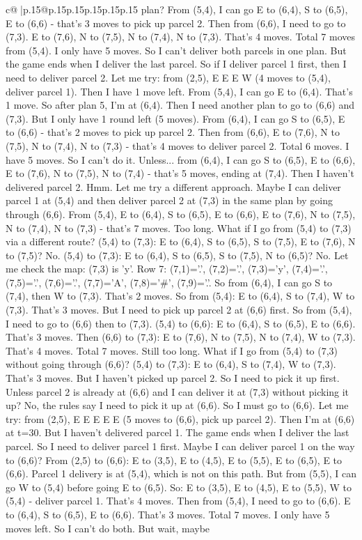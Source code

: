 \documentclass{article}
\begin{document}
{\begin{supertabular}{c@{$\;$}|p{.15\linewidth}@{}p{.15\linewidth}p{.15\linewidth}p{.15\linewidth}p{.15\linewidth}p{.15\linewidth}}
{{{plan? From (5,4), I can go E to (6,4), S to (6,5), E to (6,6) {-} that's 3 moves to pick up parcel 2. Then from (6,6), I need to go to (7,3). E to (7,6), N to (7,5), N to (7,4), N to (7,3). That's 4 moves. Total 7 moves from (5,4). I only have 5 moves. So I can't deliver both parcels in one plan. But the game ends when I deliver the last parcel. So if I deliver parcel 1 first, then I need to deliver parcel 2. Let me try: from (2,5), E E E W (4 moves to (5,4), deliver parcel 1). Then I have 1 move left. From (5,4), I can go E to (6,4). That's 1 move. So after plan 5, I'm at (6,4). Then I need another plan to go to (6,6) and (7,3). But I only have 1 round left (5 moves). From (6,4), I can go S to (6,5), E to (6,6) {-} that's 2 moves to pick up parcel 2. Then from (6,6), E to (7,6), N to (7,5), N to (7,4), N to (7,3) {-} that's 4 moves to deliver parcel 2. Total 6 moves. I have 5 moves. So I can't do it. Unless... from (6,4), I can go S to (6,5), E to (6,6), E to (7,6), N to (7,5), N to (7,4) {-} that's 5 moves, ending at (7,4). Then I haven't delivered parcel 2. Hmm. Let me try a different approach. Maybe I can deliver parcel 1 at (5,4) and then deliver parcel 2 at (7,3) in the same plan by going through (6,6). From (5,4), E to (6,4), S to (6,5), E to (6,6), E to (7,6), N to (7,5), N to (7,4), N to (7,3) {-} that's 7 moves. Too long. What if I go from (5,4) to (7,3) via a different route? (5,4) to (7,3): E to (6,4), S to (6,5), S to (7,5), E to (7,6), N to (7,5)? No. (5,4) to (7,3): E to (6,4), S to (6,5), S to (7,5), N to (6,5)? No. Let me check the map: (7,3) is 'y'. Row 7: (7,1)='.', (7,2)='.', (7,3)='y', (7,4)='.', (7,5)='.', (7,6)='.', (7,7)='A', (7,8)='\#', (7,9)='.'. So from (6,4), I can go S to (7,4), then W to (7,3). That's 2 moves. So from (5,4): E to (6,4), S to (7,4), W to (7,3). That's 3 moves. But I need to pick up parcel 2 at (6,6) first. So from (5,4), I need to go to (6,6) then to (7,3). (5,4) to (6,6): E to (6,4), S to (6,5), E to (6,6). That's 3 moves. Then (6,6) to (7,3): E to (7,6), N to (7,5), N to (7,4), W to (7,3). That's 4 moves. Total 7 moves. Still too long. What if I go from (5,4) to (7,3) without going through (6,6)? (5,4) to (7,3): E to (6,4), S to (7,4), W to (7,3). That's 3 moves. But I haven't picked up parcel 2. So I need to pick it up first. Unless parcel 2 is already at (6,6) and I can deliver it at (7,3) without picking it up? No, the rules say I need to pick it up at (6,6). So I must go to (6,6). Let me try: from (2,5), E E E E E (5 moves to (6,6), pick up parcel 2). Then I'm at (6,6) at t=30. But I haven't delivered parcel 1. The game ends when I deliver the last parcel. So I need to deliver parcel 1 first. Maybe I can deliver parcel 1 on the way to (6,6)? From (2,5) to (6,6): E to (3,5), E to (4,5), E to (5,5), E to (6,5), E to (6,6). Parcel 1 delivery is at (5,4), which is not on this path. But from (5,5), I can go W to (5,4) before going E to (6,5). So: E to (3,5), E to (4,5), E to (5,5), W to (5,4) {-} deliver parcel 1. That's 4 moves. Then from (5,4), I need to go to (6,6). E to (6,4), S to (6,5), E to (6,6). That's 3 moves. Total 7 moves. I only have 5 moves left. So I can't do both. But wait, maybe }}}
\end{supertabular}}
\end{document}
